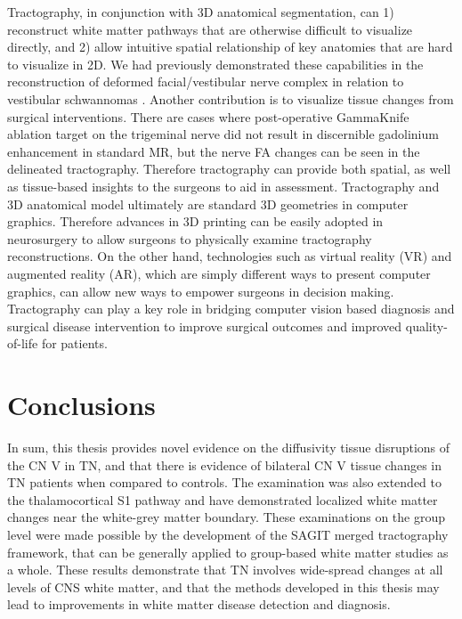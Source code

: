 Tractography, in conjunction with 3D anatomical segmentation, can 1) reconstruct white matter pathways that are otherwise difficult to visualize directly, and 2) allow intuitive spatial relationship of key anatomies that are hard to visualize in 2D. We had previously demonstrated these capabilities in the reconstruction of deformed facial/vestibular nerve complex in relation to vestibular schwannomas \cite{Chen2011b,Behan2017}.
Another contribution is to visualize tissue changes from surgical interventions. There are cases where post-operative GammaKnife ablation target on the trigeminal nerve did not result in discernible gadolinium enhancement in standard MR, but the nerve FA changes can be seen in the delineated tractography. Therefore tractography can provide both spatial, as well as tissue-based insights to the surgeons to aid in assessment.
Tractography and 3D anatomical model ultimately are standard 3D geometries in computer graphics. Therefore advances in 3D printing can be easily adopted in neurosurgery to allow surgeons to physically examine tractography reconstructions. On the other hand, technologies such as virtual reality (VR) and augmented reality (AR), which are simply different ways to present computer graphics, can allow new ways to empower surgeons in decision making. Tractography can play a key role in bridging computer vision based diagnosis and surgical disease intervention to improve surgical outcomes and improved quality-of-life for patients.   

\section{Conclusions}

In sum, this thesis provides novel evidence on the diffusivity tissue disruptions of the CN V in TN, and that there is evidence of bilateral CN V tissue changes in TN patients when compared to controls. The examination was also extended to the thalamocortical S1 pathway and have demonstrated localized white matter changes near the white-grey matter boundary. These examinations on the group level were made possible by the development of the SAGIT merged tractography framework, that can be generally applied to group-based white matter studies as a whole. These results demonstrate that TN involves wide-spread changes at all levels of CNS white matter, and that the methods developed in this thesis may lead to improvements in white matter disease detection and diagnosis.